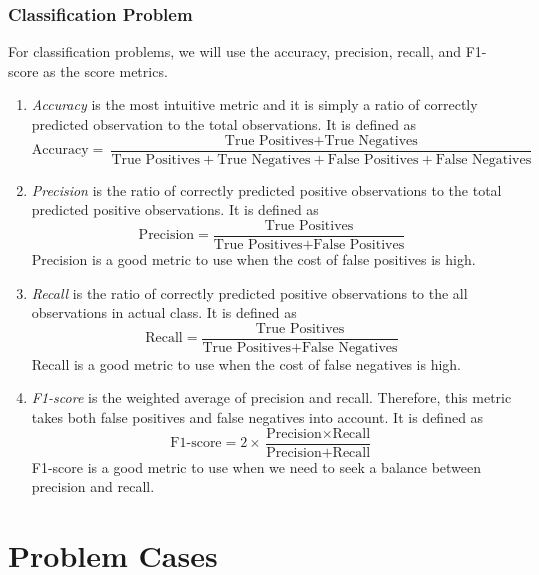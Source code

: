 \documentclass[conf]{new-aiaa}
\begin{document}
\subsubsection{Classification Problem}
For classification problems, we will use the accuracy, precision, recall, and F1-score as the score metrics.
\begin{enumerate}
\item \textit{Accuracy} is the most intuitive metric and it is simply a ratio of correctly predicted observation to the total observations. It is defined as
\begin{equation} \label{eq:accuracy}
    \textrm{Accuracy} = \frac{\textrm{True Positives} + \textrm{True Negatives}}{\textrm{True Positives} + \textrm{True Negatives} + \textrm{False Positives} + \textrm{False Negatives}}
\end{equation}
\item \textit{Precision} is the ratio of correctly predicted positive observations to the total predicted positive observations. It is defined as
\begin{equation} \label{eq:precision}
    \textrm{Precision} = \frac{\textrm{True Positives}}{\textrm{True Positives} + \textrm{False Positives}}
\end{equation}
Precision is a good metric to use when the cost of false positives is high.
\item \textit{Recall} is the ratio of correctly predicted positive observations to the all observations in actual class. It is defined as
\begin{equation} \label{eq:recall}
    \textrm{Recall} = \frac{\textrm{True Positives}}{\textrm{True Positives} + \textrm{False Negatives}}
\end{equation}
Recall is a good metric to use when the cost of false negatives is high.
\item \textit{F1-score} is the weighted average of precision and recall. Therefore, this metric takes both false positives and false negatives into account. It is defined as
\begin{equation} \label{eq:f1score}
    \textrm{F1-score} = 2 \times \frac{\textrm{Precision} \times \textrm{Recall}}{\textrm{Precision} + \textrm{Recall}}
\end{equation}
F1-score is a good metric to use when we need to seek a balance between precision and recall.
\end{enumerate}
\section{Problem Cases}
\end{document}
